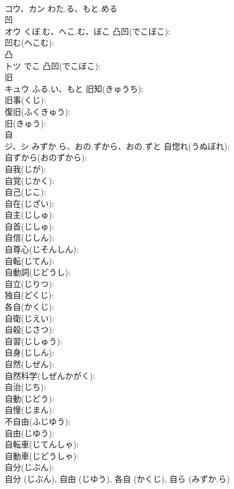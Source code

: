 \documentclass[8pt]{extreport}
\begin{document}
\begin{CJK}{UTF8}{min}
\\	コウ、カン	わた.る、もと.める		
\\	凹			
\\	オウ	くぼ.む、へこ.む、ぼこ	凸凹(でこぼこ): 
\\	凹む(へこむ): 
\\	凸			
\\	トツ	でこ	凸凹(でこぼこ): 
\\	旧			
\\	キュウ	ふる.い、もと	旧知(きゅうち): 
\\	旧事(くじ): 
\\	復旧(ふくきゅう): 
\\	旧(きゅう): 
\\	自			
\\	ジ、シ	みずか.ら、おの.ずから、おの.ずと	自惚れ(うぬぼれ): 
\\	自ずから(おのずから): 
\\	自我(じが): 
\\	自覚(じかく): 
\\	自己(じこ): 
\\	自在(じざい): 
\\	自主(じしゅ): 
\\	自首(じしゅ): 
\\	自信(じしん): 
\\	自尊心(じそんしん): 
\\	自転(じてん): 
\\	自動詞(じどうし): 
\\	自立(じりつ): 
\\	独自(どくじ): 
\\	各自(かくじ): 
\\	自衛(じえい): 
\\	自殺(じさつ): 
\\	自習(じしゅう): 
\\	自身(じしん): 
\\	自然(しぜん): 
\\	自然科学(しぜんかがく): 
\\	自治(じち): 
\\	自動(じどう): 
\\	自慢(じまん): 
\\	不自由(ふじゆう): 
\\	自由(じゆう): 
\\	自転車(じてんしゃ): 
\\	自動車(じどうしゃ): 
\\	自分(じぶん): 
\\	自分 (じぶん), 自由 (じゆう), 各自 (かくじ), 自ら (みずか.ら)

\end{CJK}
\end{document}
